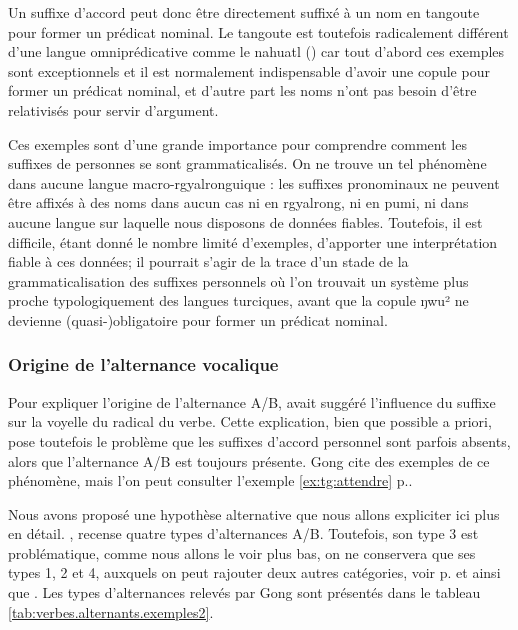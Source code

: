 \documentclass[oldfontcommands,twoside,a4paper,11pt,draft]{memoir}
\makeatletter
\newcommand{\ipa}[1]{{\phon #1}} %
\newcommand{\indextg}[1]{\index{Tangoute!\tge{#1}@\mo{#1} \tg{#1}}}
\newcommand{\tgf}[1]{\mo{#1}\indextg{#1}}
\makeatother
\begin{document}
Un suffixe d'accord peut donc être directement suffixé à un nom en tangoute pour former un prédicat nominal. Le tangoute est toutefois radicalement différent d'une langue omniprédicative comme le nahuatl (\citealt{launey94}) car tout d'abord ces exemples sont exceptionnels et il est normalement indispensable d'avoir une copule pour former un prédicat nominal, et d'autre part les noms n'ont pas besoin d'être relativisés pour servir d'argument. 



Ces exemples sont d'une grande importance pour comprendre comment les suffixes de personnes se sont grammaticalisés. On ne trouve un tel phénomène dans aucune langue macro-rgyalronguique : les suffixes pronominaux ne peuvent être affixés à des noms dans aucun cas ni en rgyalrong, ni en pumi, ni dans aucune langue sur laquelle nous disposons de données fiables. Toutefois, il est difficile, étant donné le nombre limité d'exemples, d'apporter une interprétation fiable à ces données; il pourrait s'agir de la trace d'un stade de la grammaticalisation des suffixes personnels où l'on trouvait un système plus proche typologiquement des langues turciques, avant que la copule \tgf{0508} \ipa{ŋwu²} ne devienne (quasi-)obligatoire pour former un prédicat nominal.

\subsubsection{Origine de l'alternance vocalique} \label{subsubsec:origine.alternances}
Pour expliquer l'origine de l'alternance A/B, \citet{gong01huying} avait suggéré l'influence du suffixe sur la voyelle du radical du verbe. Cette explication, bien que possible a priori, pose toutefois le problème que les suffixes d'accord personnel sont parfois absents, alors que l'alternance A/B est toujours présente. Gong cite des exemples de ce phénomène, mais l'on peut consulter l'exemple \ref{ex:tg:attendre} p.\pageref{ex:tg:attendre}.

Nous avons proposé une hypothèse alternative que nous allons expliciter ici plus en détail.  \citet{gong01huying}, \citet[239-242]{gong02a} recense quatre types d'alternances A/B. Toutefois, son type 3 est problématique, comme nous allons le voir plus bas,   on ne conservera que ses types 1, 2 et 4, auxquels on peut rajouter deux autres catégories, voir p.\pageref{ex:tg:craindre} et \citet[63]{jacques08alternations} ainsi que \citet{shijb10}. Les  types d'alternances relevés par Gong sont présentés dans le tableau \ref{tab:verbes.alternants.exemples2}.
\end{document}
